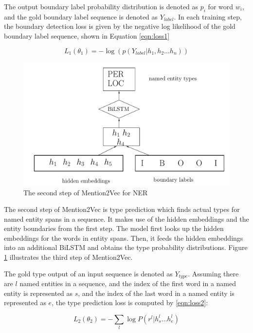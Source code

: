 The output boundary label probability distribution is denoted as $p_{i}$ for word $w_{i}$, and the gold boundary label sequence is denoted as $Y_{label}$. In each training step, the boundary detection loss is given by the negative log likelihood of the gold boundary label sequence, shown in Equation \ref{eqn:loss1}

\begin{equation}\label{eqn:loss1}
  L_{1}\left(\theta _{1}\right) =-\log \left( p\left( Y_{label}|h_{1}, h_{2} \dots h_{n}\right) \right) 
\end{equation}

\begin{figure}
  \centering
  \includegraphics[scale=0.6]{mention2vec2.pdf}
 \caption{The second step of Mention2Vec for NER}
  \label{fig:mention2vec2}
\end{figure}

The second step of Mention2Vec is type prediction which finds actual types for named entity spans in a sequence. It makes use of the hidden embeddings and the entity boundaries from the first step. The model first looks up the hidden embeddings for the words in entity spans. Then, it feeds the hidden embeddings into an additional BiLSTM and obtains the type probability distributions. Figure \ref{fig:mention2vec2} illustrates the third step of Mention2Vec.

The gold type output of an input sequence is denoted as $Y_{type}$. Assuming there are $l$ named entities in a sequence, and the index of the first word in a named entity is represented as $s$, and the index of the last word in a named entity is represented as $e$, the type prediction loss is computed by \ref{eqn:loss2}:

\begin{equation}\label{eqn:loss2}
  L_{2}\left(\theta _{2}\right) =-\sum _{l}\log P\left( r^{l}|h_{s}^{l}{\ldots }h_{e}^{l}\right)
\end{equation}

